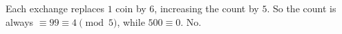 Each exchange replaces $1$ coin by $6$, increasing the count by $5$. So the count is always $\equiv99\equiv4\pmod5$, while $500\equiv0$. $\boxed{\text{No}}$.
